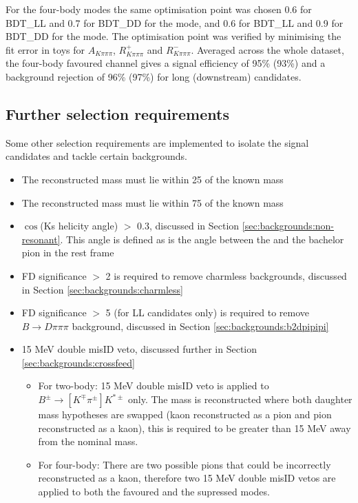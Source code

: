 For the four-body modes the same optimisation point was chosen 0.6 for BDT\_LL and 0.7 for BDT\_DD for the \decay{\Dz}{\Kp\pim\pip\pim} \decay{\Dz}{\pi\pi\pi\pi} mode, and 0.6 for BDT\_LL and 0.9 for BDT\_DD for the \decay{\Dz}{\Kp\pim\pip\pim} mode. The optimisation point was verified by minimising the fit error in toys for $A_{K\pi\pi\pi}$, $R^+_{K\pi\pi\pi}$ and $R^-_{K\pi\pi\pi}$. Averaged across the whole dataset, the four-body favoured \decay{\Bm}{\D(\Km\pip\pim\pip)\Kstarm} channel gives a signal efficiency of 95\% (93\%) and a background rejection of 96\% (97\%) for long (downstream) candidates.


\subsection{Further selection requirements}

Some other selection requirements are implemented to isolate the signal candidates and tackle certain backgrounds.

\begin{itemize}
\item The reconstructed \Dz mass must lie within 25 \mev of the known \Dz mass
\item The reconstructed \Kstarm mass must lie within 75 \mev of the known \Kstarp mass
\item{\textbar $\cos$(Ks helicity angle) \textbar $>$ 0.3, discussed in Section \ref{sec:backgrounds:non-resonant}. This angle is defined as is the angle between the \KS and the bachelor pion in the \Kstarm rest frame}
\item{\Dz FD significance $>$ 2 is required to remove charmless backgrounds, discussed in Section \ref{sec:backgrounds:charmless}}
\item{\KS FD significance $>$ 5 (for LL candidates only) is required to remove $B \to D\pi\pi\pi$ background, discussed in Section \ref{sec:backgrounds:b2dpipipi}}
\item{15 MeV double misID veto, discussed further in Section \ref{sec:backgrounds:crossfeed}}
\begin{itemize}
\item For two-body: 15 MeV double misID veto is applied to $B^{\pm} \to [K^{\mp}\pi^{\pm}] K^{*\pm}$ only. The \Dz mass is reconstructed where both daughter mass hypotheses are swapped (kaon reconstructed as a pion and pion reconstructed as a kaon), this is required to be greater than 15 MeV away from the nominal \Dz mass.
\item For four-body: There are two possible pions that could be incorrectly reconstructed as a kaon, therefore two 15 MeV double misID vetos are applied to both the favoured and the supressed modes. 
\end{itemize} 
\end{itemize}

